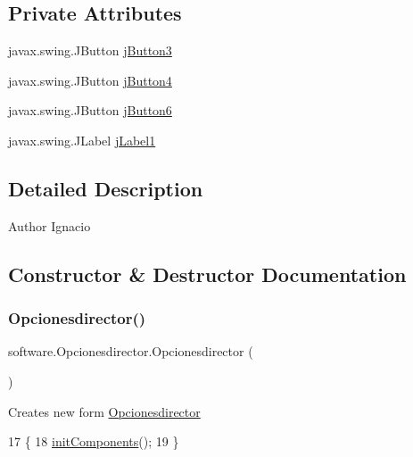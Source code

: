 \subsection*{Private Attributes}
\begin{DoxyCompactItemize}
\item 
javax.\+swing.\+J\+Button \mbox{\hyperlink{classsoftware_1_1_opcionesdirector_a6bf8e6340c64a01cd895c1194d0e2fca}{j\+Button3}}
\item 
javax.\+swing.\+J\+Button \mbox{\hyperlink{classsoftware_1_1_opcionesdirector_a2e31e9baad7d82ddcdf5f15d48c07483}{j\+Button4}}
\item 
javax.\+swing.\+J\+Button \mbox{\hyperlink{classsoftware_1_1_opcionesdirector_ab4528484730d083362682ff5055fb012}{j\+Button6}}
\item 
javax.\+swing.\+J\+Label \mbox{\hyperlink{classsoftware_1_1_opcionesdirector_aa19e2adc2e7b50296972e1d6fd9d0b65}{j\+Label1}}
\end{DoxyCompactItemize}


\subsection{Detailed Description}
\begin{DoxyAuthor}{Author}
Ignacio 
\end{DoxyAuthor}


\subsection{Constructor \& Destructor Documentation}
\mbox{\label{classsoftware_1_1_opcionesdirector_ab03556d9e7d710b395c16d98ab24896c}} 
\subsubsection{\texorpdfstring{Opcionesdirector()}{Opcionesdirector()}}
{\footnotesize\ttfamily software.\+Opcionesdirector.\+Opcionesdirector (\begin{DoxyParamCaption}{ }\end{DoxyParamCaption})\hspace{0.3cm}{\ttfamily [inline]}}

Creates new form \mbox{\hyperlink{classsoftware_1_1_opcionesdirector}{Opcionesdirector}} 
\begin{DoxyCode}
17                               \{
18         \mbox{\hyperlink{classsoftware_1_1_opcionesdirector_a239678bf3bce1d21459f8bae45749600}{initComponents}}();
19     \}
\end{DoxyCode}


